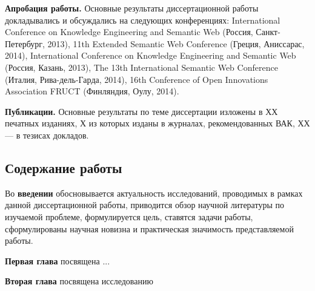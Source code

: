  


\textbf{Апробация работы.}
Основные результаты диссертационной работы докладывались и обсуждались на следующих конференциях:
International Conference on Knowledge Engineering and Semantic Web (Россия, Санкт-Петербург, 2013),
11th Extended Semantic Web Conference (Греция, Аниссарас, 2014), International Conference on Knowledge Engineering and Semantic Web (Россия, Казань, 2013), The 13th International Semantic Web Conference (Италия, Рива-дель-Гарда, 2014), 16th Conference of Open
Innovations Association FRUCT (Финляндия, Оулу, 2014).



\textbf{Публикации.} Основные результаты по теме диссертации изложены в ХХ печатных изданиях, Х из которых изданы в журналах, рекомендованных ВАК, ХХ --- в тезисах докладов.


\subsection*{\Large Содержание работы}
Во \textbf{введении} обосновывается актуальность исследований, проводимых в рамках данной диссертационной работы, приводится обзор научной литературы по изучаемой проблеме, формулируется цель, ставятся задачи работы, сформулированы научная новизна и практическая значимость представляемой работы.

\textbf{Первая глава} посвящена ...



\textbf{Вторая глава} посвящена исследованию 

